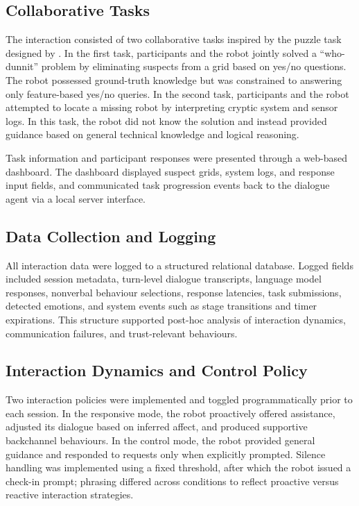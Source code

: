 \documentclass[
  authoryear,
  doubleblind,
  3p]{elsarticle}
\begin{document}
\subsection{Collaborative Tasks}\label{collaborative-tasks}

The interaction consisted of two collaborative tasks inspired by the
puzzle task designed by \citet{lin2022}. In the first task, participants
and the robot jointly solved a ``who-dunnit'' problem by eliminating
suspects from a grid based on yes/no questions. The robot possessed
ground-truth knowledge but was constrained to answering only
feature-based yes/no queries. In the second task, participants and the
robot attempted to locate a missing robot by interpreting cryptic system
and sensor logs. In this task, the robot did not know the solution and
instead provided guidance based on general technical knowledge and
logical reasoning.

Task information and participant responses were presented through a
web-based dashboard. The dashboard displayed suspect grids, system logs,
and response input fields, and communicated task progression events back
to the dialogue agent via a local server interface.

\subsection{Data Collection and
Logging}\label{data-collection-and-logging}

All interaction data were logged to a structured relational database.
Logged fields included session metadata, turn-level dialogue
transcripts, language model responses, nonverbal behaviour selections,
response latencies, task submissions, detected emotions, and system
events such as stage transitions and timer expirations. This structure
supported post-hoc analysis of interaction dynamics, communication
failures, and trust-relevant behaviours.

\subsection{Interaction Dynamics and Control
Policy}\label{interaction-dynamics-and-control-policy}

Two interaction policies were implemented and toggled programmatically
prior to each session. In the responsive mode, the robot proactively
offered assistance, adjusted its dialogue based on inferred affect, and
produced supportive backchannel behaviours. In the control mode, the
robot provided general guidance and responded to requests only when
explicitly prompted. Silence handling was implemented using a fixed
threshold, after which the robot issued a check-in prompt; phrasing
differed across conditions to reflect proactive versus reactive
interaction strategies.
\end{document}
